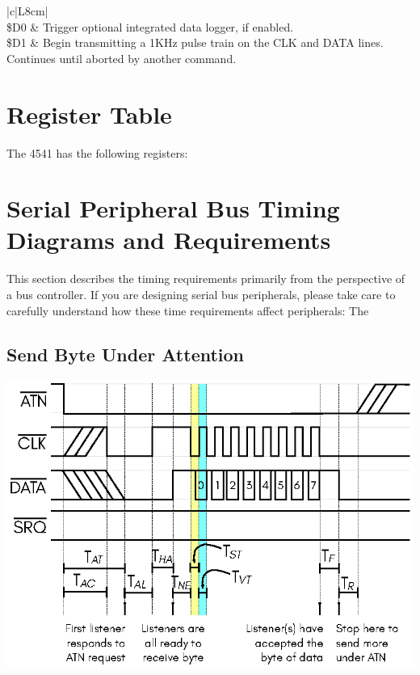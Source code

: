 \begin{center}
\begin{longtable}{|c|L{8cm}|}
         \\
        \hline
        \$D0 & Trigger optional integrated data logger, if enabled. \\
        \hline
        \$D1 & Begin transmitting a 1KHz pulse train on the CLK and
        DATA lines. Continues until aborted by another command. \\
        \hline
    \end{longtable}
\end{center}


\section{Register Table}

The 4541 has the following registers:



\section{Serial Peripheral Bus Timing Diagrams and Requirements}

This section describes the timing requirements primarily from the
perspective of a bus controller. If you are designing serial bus
peripherals, please take care to carefully understand how these time
requirements affect peripherals: The 


\subsection{Send Byte Under Attention}

\begin{center}
\includegraphics{images/IEC-Timing-Diagrams/IEC-Timing-Diagram-ATN-Send-Byte}
\end{center}

